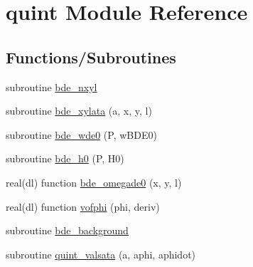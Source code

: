 \hypertarget{namespacequint}{}\section{quint Module Reference}
\label{namespacequint}
\subsection*{Functions/\+Subroutines}
\begin{DoxyCompactItemize}
\item 
subroutine \mbox{\hyperlink{namespacequint_a90306420209b7de0bec2152dd1e024bb}{bde\+\_\+nxyl}}
\item 
subroutine \mbox{\hyperlink{namespacequint_a37db272f12e135ca0061bd66bfccab65}{bde\+\_\+xylata}} (a, x, y, l)
\item 
subroutine \mbox{\hyperlink{namespacequint_aab2e2c5f2a7e9e56f0852539b0933259}{bde\+\_\+wde0}} (P, w\+B\+D\+E0)
\item 
subroutine \mbox{\hyperlink{namespacequint_aa2daf9edc78c79ba058ae4833682c9a8}{bde\+\_\+h0}} (P, H0)
\item 
real(dl) function \mbox{\hyperlink{namespacequint_ae1b7ac10a36d63310cbfe418b53b9684}{bde\+\_\+omegade0}} (x, y, l)
\item 
real(dl) function \mbox{\hyperlink{namespacequint_aeb3b6422b8cc4a091d00b74a6c2d6bf6}{vofphi}} (phi, deriv)
\item 
subroutine \mbox{\hyperlink{namespacequint_a6a96dda084f9c9c3188eaa2576b9bfe2}{bde\+\_\+background}}
\item 
subroutine \mbox{\hyperlink{namespacequint_a4f9009a5b36a9b95e58f74d25e1bb1b7}{quint\+\_\+valsata}} (a, aphi, aphidot)
\end{DoxyCompactItemize}
